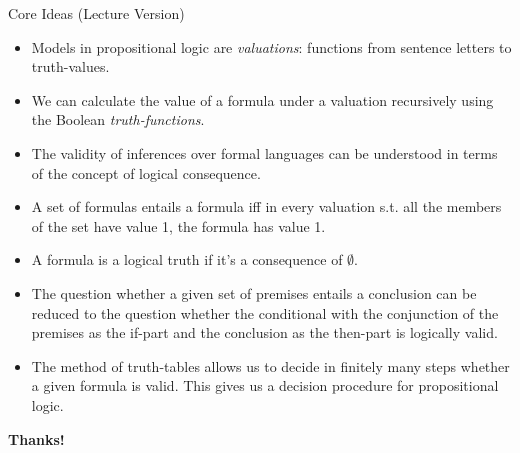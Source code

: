 \begin{frame}{Core Ideas (Lecture Version)}
 
\begin{itemize}

	\item Models in propositional logic are \emph{valuations}: functions from sentence letters to truth-values.
	
	\item We can calculate the value of a formula under a valuation recursively using the Boolean \emph{truth-functions}.
	
	\item The validity of inferences over formal languages can be understood in terms of the concept of logical consequence.
	
	\item A set of formulas entails a formula iff in every valuation s.t. all the members of the set have value 1, the formula has value 1.
	
	\item A formula is a logical truth if it's a consequence of $\emptyset$.
	
	\item The question whether a given set of premises entails a conclusion can be reduced to the question whether the conditional with the conjunction of the premises as the if-part and the conclusion as the then-part is logically valid.
		
	\item The method of truth-tables allows us to decide in finitely many steps whether a given formula is valid. This gives us a decision procedure for propositional logic.
	
	
\end{itemize}


\end{frame}


\begin{frame}

	\begin{center}
	{\huge\bf Thanks!}
	\end{center}

\end{frame}

